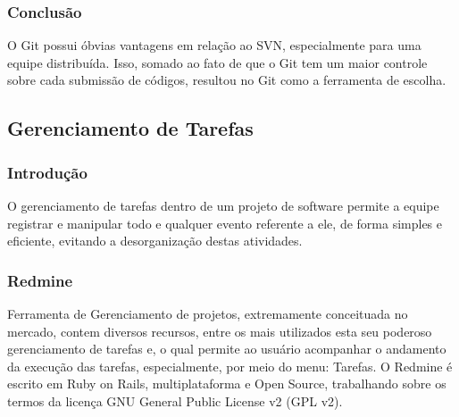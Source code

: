 \documentclass[12pt,a4paper]{article}
\begin{document}
		\subsubsection{Conclusão}
		
			O Git possui óbvias vantagens em relação ao SVN, especialmente para uma equipe
			distribuída. Isso, somado ao fato de que o Git tem um maior controle sobre
			cada submissão de códigos, resultou no Git como a ferramenta de escolha.

	\clearpage		
	\subsection{Gerenciamento de Tarefas}
		\subsubsection{Introdução}
		
			O gerenciamento de tarefas dentro de um projeto de software permite a equipe registrar e manipular todo e qualquer evento referente a ele, de forma simples e eficiente, evitando a desorganização destas atividades. 

		\subsubsection{Redmine}
			
			Ferramenta de Gerenciamento de projetos, extremamente conceituada no mercado, contem diversos recursos, entre os mais utilizados esta seu poderoso gerenciamento de tarefas e, o qual permite ao usuário acompanhar o andamento da  execução das tarefas, especialmente, por meio do menu: Tarefas.
			O Redmine é escrito em Ruby on Rails, multiplataforma e Open Source, trabalhando sobre os termos da licença GNU General Public License v2 (GPL v2).
		
\end{document}
